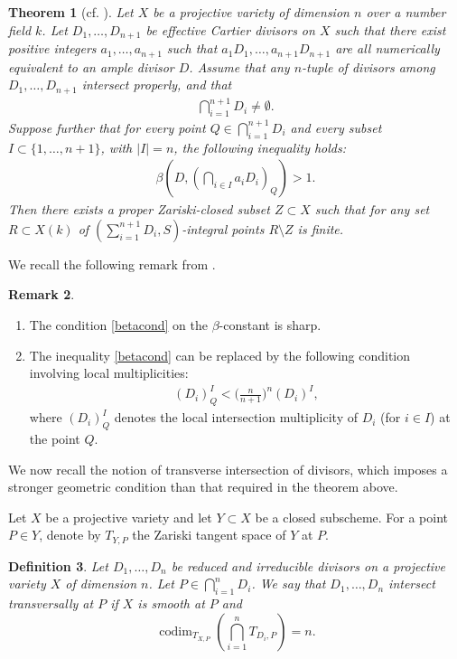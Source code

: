 \documentclass[10pt]{amsart}
\numberwithin{equation}{section}
\theoremstyle{plain}
\newtheorem{theorem}{Theorem}[section]
\newtheorem{definition}[theorem]{Definition}
\theoremstyle{definition}
\newtheorem{remark}[theorem]{Remark}
\begin{document}
\begin{theorem}[cf. {\cite[Theorems 1.4]{WX2025}}]\label{mainTheorem2}
Let $X$ be a  projective variety  of dimension $n$ over a number field $k$. 
Let $D_1, \ldots,D_{n+1}$ be effective Cartier  divisors on $X$ such that  there exist positive integers $a_1,\ldots, a_{n+1}$ such that $a_1D_1, \ldots, a_{n+1}D_{n+1}$ are all numerically equivalent to an ample divisor $D$.  
Assume that   any $n$-tuple of divisors among  $D_1, \ldots,D_{n+1}$ intersect properly, and that
\begin{align*}
\bigcap_{i=1}^{n+1}D_i\neq \emptyset.
\end{align*}
Suppose further that for every point 
 $Q\in  \bigcap_{i=1}^{n+1}D_i  $ and every subset $I \subset \{1,\ldots,n+1\}$, with $|I|=n$,  the following inequality holds:
 \begin{align}
\label{betacond}
\beta(D,(\bigcap_{i \in I}a_iD_i)_Q)>1.
\end{align}
Then  there exists a proper Zariski-closed subset $Z\subset X$ such that for any set $R\subset X(k)$ of $(\sum_{i=1}^{n+1}D_i, S)$-integral points   $ R\setminus Z$ is finite.
 \end{theorem}
We recall the following remark from \cite{WX2025}.
\begin{remark}\label{localcondition}
\begin{enumerate}
\item The condition \eqref{betacond} on the $\beta$-constant is sharp.
\item The inequality \eqref{betacond}  can be replaced by the following condition involving local multiplicities:
 \begin{align}\label{localmultip} 
   (D_i)^I_Q<\bigg(\frac{n}{n+1}\bigg)^n (D_i)^I, 
\end{align}
where $(D_i)^I_Q$ denotes the local intersection multiplicity of $D_i$ (for  $i\in I$) at the point  $Q$.  \end{enumerate}
\end{remark}

We now recall the notion of transverse intersection of divisors, which imposes a stronger geometric condition than that required in the theorem above.
 
Let $X$ be a projective variety and let $Y \subset X$ be a closed subscheme. 
For a point $P \in Y$, denote by $T_{Y,P}$ the Zariski tangent space of $Y$ at $P$.
\begin{definition}\label{transversal}
Let $D_1,\ldots,D_{n}$ be reduced and irreducible divisors on a  projective variety $X$ of dimension $n$.
Let $P\in \bigcap_{i=1}^{n} D_i$.
We say that $D_1,\ldots,D_{n}$ intersect transversally at $P$ if $X$ is smooth at $P$ and
\[
\operatorname{codim}_{T_{X,P}}
\left(\bigcap_{i=1}^n T_{{ D_i},P}\right)=n.
\]
\end{definition}
 
\end{document}
